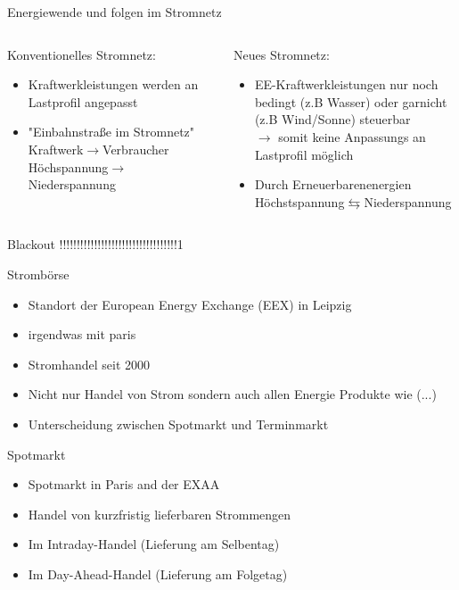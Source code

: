 \documentclass[aspectratio=1610, professionalfonts, 9pt]{beamer}
\begin{document}
\begin{frame}{Energiewende und folgen im Stromnetz}
  \begin{columns}
  \begin{column}{0.5\textwidth}
Konventionelles Stromnetz:
\begin{itemize}
  \item Kraftwerkleistungen werden an Lastprofil angepasst
  \item "Einbahnstraße im Stromnetz" Kraftwerk$\rightarrow$Verbraucher
Höchspannung$\rightarrow$Niederspannung
\end{itemize}
  \end{column}
  \begin{column}{0.5\textwidth}
Neues Stromnetz:
\begin{itemize}
\item EE-Kraftwerkleistungen nur noch bedingt (z.B Wasser) oder garnicht (z.B Wind/Sonne) steuerbar\\$\rightarrow$ somit keine Anpassungs an Lastprofil möglich
\item Durch Erneuerbarenenergien Höchstspannung$\leftrightarrows$Niederspannung
\end{itemize}
\end{column}
\end{columns}
\end{frame}


\begin{frame}{Blackout}
!!!!!!!!!!!!!!!!!!!!!!!!!!!!!!!!!!1
\end{frame}




\begin{frame}{Strombörse}
\begin{itemize}
  \item Standort der European Energy Exchange (EEX) in Leipzig
\item irgendwas mit paris
  \item Stromhandel seit \num{2000}
  \item Nicht nur Handel von Strom sondern auch allen Energie Produkte wie (...)
  \item Unterscheidung zwischen Spotmarkt und Terminmarkt
\end{itemize}
\end{frame}

\begin{frame}{Spotmarkt}
\begin{itemize}
\item Spotmarkt in Paris and der EXAA
\item Handel von kurzfristig lieferbaren Strommengen
\item Im Intraday-Handel (Lieferung am Selbentag)
\item Im Day-Ahead-Handel (Lieferung am Folgetag)
\end{itemize}
\end{frame}
\end{document}
